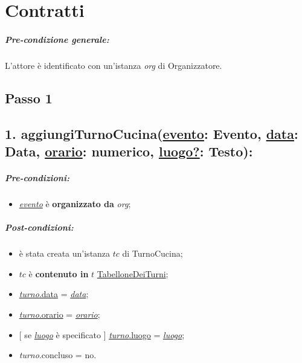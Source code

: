 \chapter{Contratti}
\paragraph{Pre-condizione generale:} L'attore è identificato con un'istanza \textit{org} di Organizzatore.

\section{Passo 1}
\section*{1. aggiungiTurnoCucina(\underline{evento}: Evento,  \underline{data}: Data, \underline{orario}: numerico, \underline{luogo?}: Testo):}

\paragraph{Pre-condizioni:}

\begin{itemize}
  \item \underline{\textit{evento}} è \textbf{organizzato da} {\textit{org}};
\end{itemize}

\paragraph{Post-condizioni:}

\begin{itemize}
    \item è stata creata un'istanza $tc$ di TurnoCucina;
    \item $tc$ è \textbf{contenuto in} $t$ \underline{TabelloneDeiTurni};
    \item \underline{\textit{turno}.data} = \underline{\textit{data}};
    
    \item \underline{\textit{turno}.orario} = \underline{\textit{orario}};
    \item $[$ se \underline{\textit{luogo}} è specificato $]$ \underline{\textit{turno}.luogo} = \underline{\textit{luogo}};
    \item \textit{turno}.concluso  = no.
\end{itemize}

